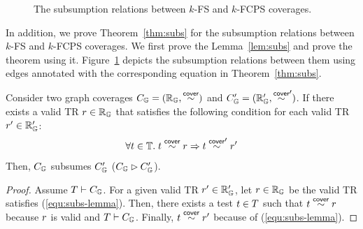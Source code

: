 
\begin{figure}
  \centering
  \small
  \caption{
    The subsumption relations between $k$-FS and $k$-FCPS coverages.
  }
  \label{fig:subs}
\end{figure}

In addition, we prove Theorem~\ref{thm:subs} for the subsumption relations
between $k$-FS and $k$-FCPS coverages.
%
We first prove the Lemma~\ref{lem:subs} and prove the theorem using it.
%
Figure~\ref{fig:subs} depicts the subsumption relations between them using edges
annotated with the corresponding equation in Theorem~\ref{thm:subs}.


\begin{lemma}\label{lem:subs}
  Consider two graph coverages $C_{\mathbb{G}} = (\mathbb{R}_{\mathbb{G}}, \overset{\textsf{cover}}{\sim})$ and
  $C_{\mathbb{G}}' = (\mathbb{R}_{\mathbb{G}}', \overset{\textsf{cover}}{\sim}')$.
  If there exists a valid TR $r \in \mathbb{R}_{\mathbb{G}}$ that satisfies the following
  condition for each valid TR $r' \in \mathbb{R}_{\mathbb{G}}'$:
  \begin{equation}\label{equ:subs-lemma}
    \forall t \in \mathbb{T}. \; t \overset{\textsf{cover}}{\sim} r \Rightarrow t \overset{\textsf{cover}}{\sim}' r'
  \end{equation}
  Then, $C_{\mathbb{G}}$ subsumes $C_{\mathbb{G}}'$ ($C_{\mathbb{G}}
  \rhd C_{\mathbb{G}}'$).
\end{lemma}
\begin{proof}
  Assume $T \vdash C_{\mathbb{G}}$.
  For a given valid TR $r' \in \mathbb{R}_{\mathbb{G}}'$, let $r \in \mathbb{R}_{\mathbb{G}}$
  be the valid TR satisfies (\ref{equ:subs-lemma}).
  Then, there exists a test $t \in T$ such that $t \overset{\textsf{cover}}{\sim} r$ because
  $r$ is valid and $T \vdash C_{\mathbb{G}}$.
  Finally, $t \overset{\textsf{cover}}{\sim} r'$ because of (\ref{equ:subs-lemma}).
\end{proof}

